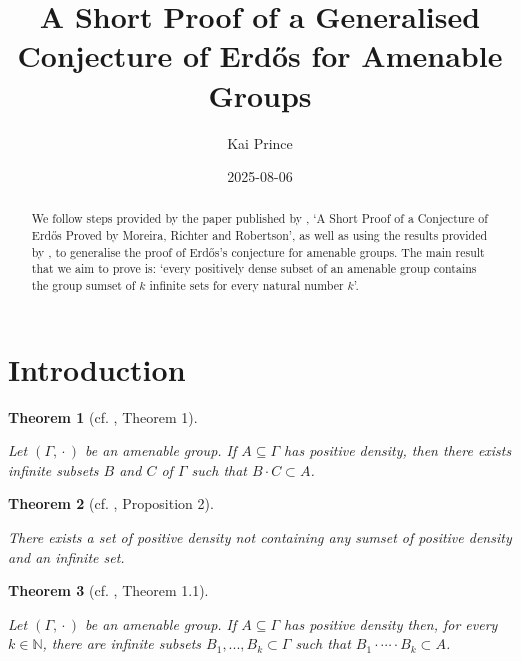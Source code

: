 \documentclass[
  british,
]{article}
\title{A Short Proof of a Generalised Conjecture of Erdős for Amenable
Groups}
\author{Kai Prince}
\date{2025-08-06}
\renewcommand*\contentsname{Table of contents}
\newcommand\contentsname{Table of contents}
\theoremstyle{plain}
\theoremstyle{plain}
\newtheorem{theorem}{Theorem}[section]
\theoremstyle{definition}
\theoremstyle{remark}
\newcommand{\AmenableGroup}{{\Gamma}}
\newcommand{\GroupOperation}[2]{{#1}\cdot{#2}}
\begin{document}
\maketitle
\begin{abstract}
We follow steps provided by the paper published by
, `A Short Proof of a
Conjecture of Erdős Proved by Moreira, Richter and Robertson', as well
as using the results provided by , to generalise the proof of Erdős's conjecture for amenable
groups. The main result that we aim to prove is: `every positively dense
subset of an amenable group contains the group sumset of \(k\) infinite
sets for every natural number \(k\)'.
\end{abstract}

\renewcommand*\contentsname{Table of contents}
{
\hypersetup{linkcolor=}
\setcounter{tocdepth}{3}
\tableofcontents
}

\section{Introduction}\label{introduction}

\begin{theorem}[cf. , Theorem
1]\protect\hypertarget{thm-GenErdosConjComb}{}\label{thm-GenErdosConjComb}

Let \((\AmenableGroup,\GroupOperation{}{})\) be an amenable group. If
\(A\subseteq\AmenableGroup\) has positive density, then there exists
infinite subsets \(B\) and \(C\) of \(\AmenableGroup\) such that
\(\GroupOperation{B}{C}\subset A\).

\end{theorem}

\begin{theorem}[cf. ,
Proposition
2]\protect\hypertarget{thm-GenErdosConjRel}{}\label{thm-GenErdosConjRel}

There exists a set of positive density not containing any sumset of
positive density and an infinite set.

\end{theorem}

\begin{theorem}[cf. ,
Theorem
1.1]\protect\hypertarget{thm-GenNErdosConjComb}{}\label{thm-GenNErdosConjComb}

Let \((\AmenableGroup,\GroupOperation{}{})\) be an amenable group. If
\(A\subseteq\AmenableGroup\) has positive density then, for every
\(k\in\mathbb{N}\), there are infinite subsets
\(B_1,...,B_k\subset\AmenableGroup\) such that
\(B_1\cdot\cdots\cdot B_k\subset A\).

\end{theorem}
\end{document}
